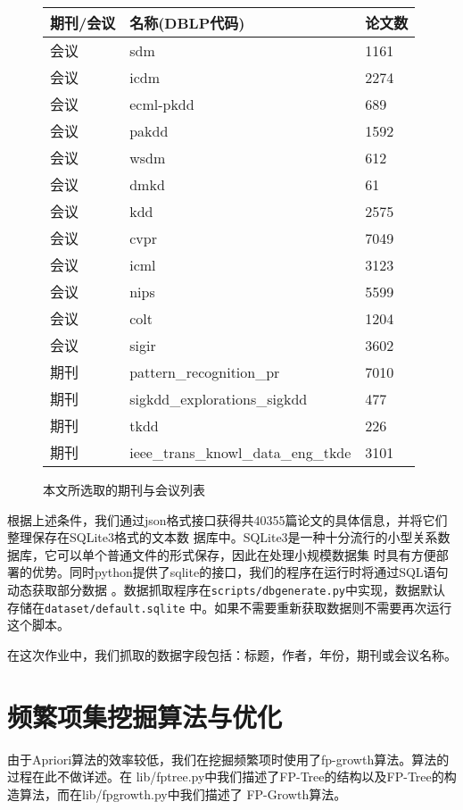 \documentclass[a4paper]{article}
\begin{document}
\begin{figure}[ht]
  \centering
  \begin{tabular}{lll}
    \hline
    期刊/会议 & 名称(DBLP代码) & 论文数 \\
    \hline
    会议 & sdm & 1161\\
    会议 & icdm & 2274\\
    会议 & ecml-pkdd & 689\\
    会议 & pakdd & 1592\\
    会议 & wsdm & 612\\
    会议 & dmkd & 61\\
    会议 & kdd & 2575\\
    会议 & cvpr & 7049\\
    会议 & icml & 3123\\
    会议 & nips & 5599\\
    会议 & colt & 1204\\
    会议 & sigir & 3602\\
    期刊 & pattern\_recognition\_pr & 7010\\
    期刊 & sigkdd\_explorations\_sigkdd & 477\\
    期刊 & tkdd & 226\\
    期刊 & ieee\_trans\_knowl\_data\_eng\_tkde & 3101\\
    \hline
  \end{tabular}
  \label{table:dataset}
  \caption{本文所选取的期刊与会议列表}
\end{figure}

根据上述条件，我们通过json格式接口获得共40355篇论文的具体信息，并将它们整理保存在SQLite3格式的文本数
据库中。SQLite3是一种十分流行的小型关系数据库，它可以单个普通文件的形式保存，因此在处理小规模数据集
时具有方便部署的优势。同时python提供了sqlite的接口，我们的程序在运行时将通过SQL语句动态获取部分数据
。数据抓取程序在\texttt{scripts/dbgenerate.py}中实现，数据默认存储在\texttt{dataset/default.sqlite}
中。如果不需要重新获取数据则不需要再次运行这个脚本。

在这次作业中，我们抓取的数据字段包括：标题，作者，年份，期刊或会议名称。

\section{频繁项集挖掘算法与优化}
由于Apriori算法的效率较低，我们在挖掘频繁项时使用了fp-growth算法。算法的过程在此不做详述。在
lib/fptree.py中我们描述了FP-Tree的结构以及FP-Tree的构造算法，而在lib/fpgrowth.py中我们描述了
FP-Growth算法。
\end{document}
